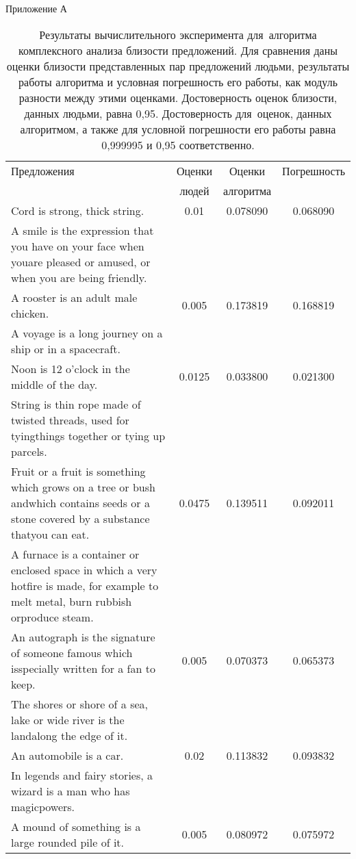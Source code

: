 Приложение А
\begin{table}[p]
\caption{
Результаты вычислительного эксперимента для~алгоритма комплексного анализа 
близости предложений.
Для сравнения даны оценки близости представленных пар предложений людьми, 
результаты работы алгоритма и условная погрешность его работы, как модуль разности между этими оценками.
Достоверность оценок близости, данных людьми, равна 0,95. Достоверность для~оценок,
данных алгоритмом, а также для условной погрешности его работы равна 0,999995 и 0,95 соответственно. 
}
\label{table_result}
\begin{center}
{\Large
\begin{tabular}{|p{9cm}|c|c|c|}
\hline
Предложения & Оценки & Оценки & Погрешность  \\
 & людей & алгоритма &  \\
\hline
Cord is strong, thick string. & 0.01 & 0.078090 & 0.068090 \\
A smile is the expression that you have on your face when youare pleased or amused, or when you are being friendly. & & & \\
\hline
A rooster is an adult male chicken. & 0.005 & 0.173819 & 0.168819 \\
A voyage is a long journey on a ship or in a spacecraft. & & & \\
\hline
Noon is 12 o'clock in the middle of the day. & 0.0125 & 0.033800 & 0.021300 \\
String is thin rope made of twisted threads, used for tyingthings together or tying up parcels. & & & \\
\hline
Fruit or a fruit is something which grows on a tree or bush andwhich contains seeds or a stone covered by a substance thatyou can eat. & 0.0475 & 0.139511 & 0.092011 \\
A furnace is a container or enclosed space in which a very hotfire is made, for example to melt metal, burn rubbish orproduce steam. & & & \\
\hline
An autograph is the signature of someone famous which isspecially written for a fan to keep. & 0.005 & 0.070373 & 0.065373 \\
The shores or shore of a sea, lake or wide river is the landalong the edge of it. & & & \\
\hline
An automobile is a car. & 0.02 & 0.113832 & 0.093832 \\
In legends and fairy stories, a wizard is a man who has magicpowers. & & & \\
\hline
A mound of something is a large rounded pile of it. & 0.005 & 0.080972 & 0.075972 \\

\end{tabular}}
\end{center}
\end{table}
